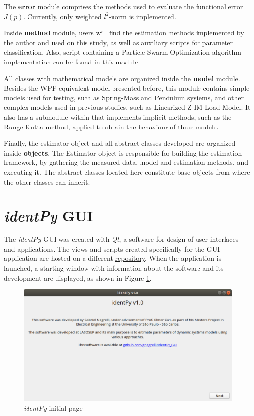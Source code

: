 The \textbf{error} module comprises the methods used to evaluate the functional error $J(p)$. Currently, only weighted $l^{2}$-norm is implemented.

Inside \textbf{method} module, users will find the estimation methods implemented by the author and used on this study, as well as auxiliary scripts for parameter classification. Also, script containing a Particle Swarm Optimization algorithm implementation can be found in this module.

All classes with mathematical models are organized inside the \textbf{model} module. Besides the WPP equivalent model presented before, this module contains simple models used for testing, such as Spring-Mass and Pendulum systems, and other complex models used in previous studies, such as Linearized Z-IM Load Model. It also has a submodule within that implements implicit methods, such as the Runge-Kutta method, applied to obtain the behaviour of these models.

Finally, the estimator object and all abstract classes developed are organized inside \textbf{objects}. The Estimator object is responsible for building the estimation framework, by gathering the measured data, model and estimation methods, and executing it. The abstract classes located here constitute base objects from where the other classes can inherit.

\section{\textit{identPy} GUI}

The \textit{identPy} GUI was created with \textit{Qt}, a software for design of user interfaces and applications. The views and scripts created specifically for the GUI application are hosted on a different \href{https://github.com/gnegrelli/identPy_GUI}{repository}. When the application is launched, a starting window with information about the software and its development are displayed, as shown in Figure \ref{fig: initial_page}.

\begin{figure}[!h]
	\caption{\textit{identPy} initial page}
	\begin{center}
		\includegraphics[scale=.5]{Images/Software_initial_page.eps}
	\end{center}
	\label{fig: initial_page}
\end{figure}

